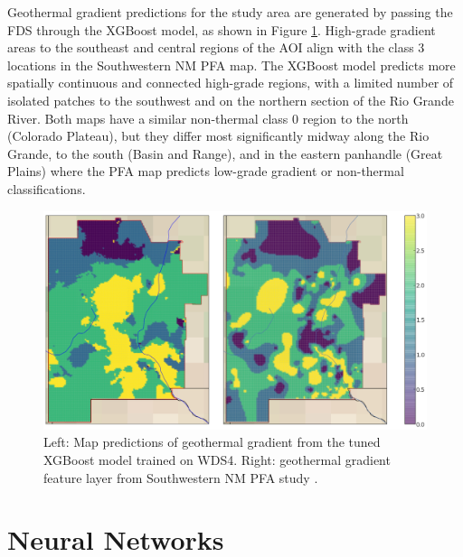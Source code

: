 Geothermal gradient predictions for the study area are generated by passing the FDS through the XGBoost model, as shown in Figure \ref{fig:xgb_final_map}. High-grade gradient areas to the southeast and central regions of the AOI align with the class 3 locations in the \citet{bielicki_hydrogeolgic_2015} Southwestern NM PFA map. The XGBoost model predicts more spatially continuous and connected high-grade regions, with a limited number of isolated patches to the southwest and on the northern section of the Rio Grande River. Both maps have a similar non-thermal class 0 region to the north (Colorado Plateau), but they differ most significantly midway along the Rio Grande, to the south (Basin and Range), and in the eastern panhandle (Great Plains) where the PFA map predicts low-grade gradient or non-thermal classifications.

\begin{figure}[!htp]
\centering
\includegraphics[width=\textwidth]{templates/images/Figure-XGB-FinalMap_Joint.png}
\caption[XGBoost prediction map]{Left: Map predictions of geothermal gradient from the tuned XGBoost model trained on WDS4. Right: geothermal gradient feature layer from Southwestern NM PFA study \protect\citep{bielicki_hydrogeolgic_2015}.}
\label{fig:xgb_final_map}
\end{figure}

\section{Neural Networks}\label{ch5:ann_model}
